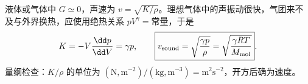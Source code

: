 液体或气体中 $G\simeq0$，声速为 $v=\sqrt{K/\rho}$。理想气体中的声振动很快，气团来不及与外界换热，应使用绝热关系 $pV^\gamma=\text{常量}$，于是
\begin{equation}
 K=-V\frac{\dd p}{\dd V}=\gamma p,\qquad
 \boxed{v_{\rm sound}=\sqrt{\frac{\gamma p}{\rho}}
 =\sqrt{\frac{\gamma RT}{M_{\rm mol}}}}.
 \label{r2ch07:eq:025}
\end{equation}
量纲检查：$K/\rho$ 的单位为 $(\mathrm{N,m^{-2}})/(\mathrm{kg,m^{-3}})=\mathrm{m^2s^{-2}}$，开方后确为速度。
